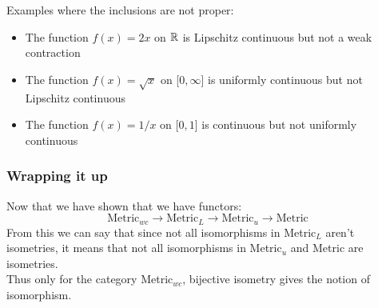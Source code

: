 \begin{frame}
    Examples where the inclusions are not proper:
    \begin{itemize}
        \item The function \(f(x)=2x\) on \(\mathbb{R}\) is Lipschitz continuous but not a weak contraction
        \item The function \(f(x)=\sqrt{x}\) on [\(0,\infty\)] is uniformly continuous but not Lipschitz continuous
        \item The function \(f(x)=1/x\) on [\(0,1\)] is continuous but not uniformly continuous
    \end{itemize}
\end{frame}

\begin{frame}
    \frametitle{Wrapping it up}
    Now that we have shown that we have functors:
    \begin{equation*}
        \text{Metric}_{wc} \rightarrow \text{Metric}_L \rightarrow \text{Metric}_u \rightarrow \text{Metric}
    \end{equation*}
    From this we can say that since not all isomorphisms in Metric\(_{L}\) aren't isometries, 
    \pause
    it means that not all isomorphisms in Metric\(_u\) and Metric are isometries.\\
    Thus only for the category Metric\(_{wc}\), bijective isometry gives the notion of isomorphism.

\end{frame}